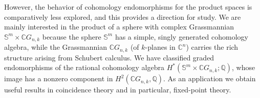 \documentclass{amsart}
\begin{document}
    However, the behavior of cohomology endomorphisms for the product spaces is comparatively less explored, and this provides a direction for study.
    We are mainly interested in the product of a sphere
	with complex Grassmannian $\mathbb S^m\times \mathbb CG_{n,k}$ because the sphere $\mathbb{S}^m$ has a simple, singly generated cohomology algebra, while the Grassmannian $\mathbb{C}G_{n,k}$ (of $k$-planes in $\mathbb C^n$)
	carries the rich structure arising from Schubert calculus. We have classified graded endomorphisms of the rational cohomology algebra $H^*(\mathbb{S}^m \times \mathbb{C}G_{n,k};\mathbb{Q})$, whose image has a nonzero component in $H^2(\mathbb CG_{n,k},\mathbb Q)$.  As an application we obtain useful results in coincidence theory and in particular, fixed-point theory.  
	
\end{document}

